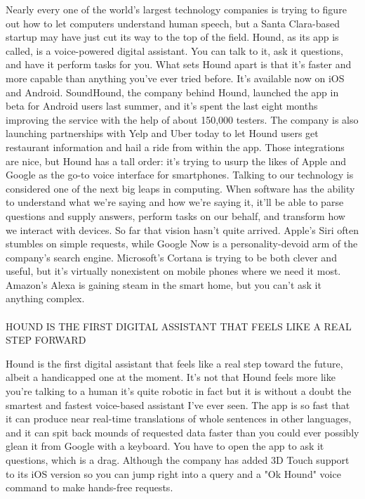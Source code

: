 \documentclass[12pt,a4paper]{article}
\begin{document}
\par Nearly every one of the world's largest technology companies is trying to figure out how to let computers understand human speech, but a Santa Clara-based startup may have just cut its way to the top of the field. Hound, as its app is called, is a voice-powered digital assistant. You can talk to it, ask it questions, and have it perform tasks for you. What sets Hound apart is that it's faster and more capable than anything you've ever tried before. It's available now on iOS and Android.
SoundHound, the company behind Hound, launched the app in beta for Android users last summer, and it's spent the last eight months improving the service with the help of about 150,000 testers. The company is also launching partnerships with Yelp and Uber today to let Hound users get restaurant information and hail a ride from within the app. Those integrations are nice, but Hound has a tall order: it's trying to usurp the likes of Apple and Google as the go-to voice interface for smartphones.
Talking to our technology is considered one of the next big leaps in computing. When software has the ability to understand what we're saying and how we're saying it, it'll be able to parse questions and supply answers, perform tasks on our behalf, and transform how we interact with devices. So far that vision hasn't quite arrived. Apple's Siri often stumbles on simple requests, while Google Now is a personality-devoid arm of the company's search engine. Microsoft's Cortana is trying to be both clever and useful, but it's virtually nonexistent on mobile phones where we need it most. Amazon's Alexa is gaining steam in the smart home, but you can't ask it anything complex.
\\\\ HOUND IS THE FIRST DIGITAL ASSISTANT THAT FEELS LIKE A REAL STEP FORWARD
\par Hound is the first digital assistant that feels like a real step toward the future, albeit a handicapped one at the moment. It's not that Hound feels more like you're talking to a human it's quite robotic in fact but it is without a doubt the smartest and fastest voice-based assistant I've ever seen. The app is so fast that it can produce near real-time translations of whole sentences in other languages, and it can spit back mounds of requested data faster than you could ever possibly glean it from Google with a keyboard. You have to open the app to ask it questions, which is a drag. Although the company has added 3D Touch support to its iOS version so you can jump right into a query and a "Ok Hound" voice command to make hands-free requests.
\end{document}
